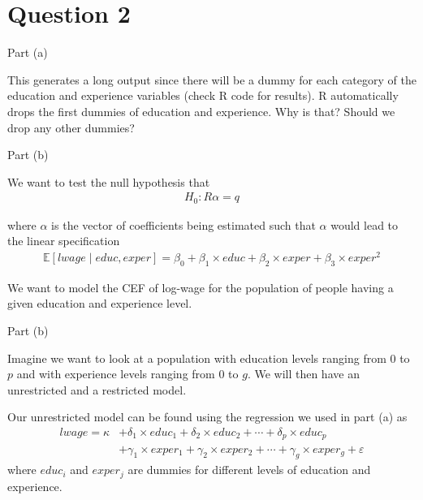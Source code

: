 \section{Question 2}

\begin{frame}{Part (a)}
    
    This generates a long output since there will be a dummy for each category of the education and experience variables (check R code for results). R automatically drops the first dummies of education and experience. Why is that? Should we drop any other dummies?
    
\end{frame}

\begin{frame}{Part (b)}

    We want to test the null hypothesis that
    \begin{align*}
        H_0: R \alpha = q
    \end{align*}

    where $\alpha$ is the vector of coefficients being estimated such that $\alpha$ would lead to the linear specification
    \begin{align*}
        \mathbb{E} [lwage \mid educ, exper] = \beta_0 + \beta_1 \times educ + \beta_2 \times exper + \beta_3 \times exper^2 
    \end{align*}

    We want to model the CEF of log-wage for the population of people having a given education and experience level.
    
\end{frame}

\begin{frame}{Part (b)}

    Imagine we want to look at a population with education levels ranging from $0$ to $p$ and with experience levels ranging from $0$ to $g$. We will then have an unrestricted and a restricted model.

    Our unrestricted model can be found using the regression we used in part (a) as
    \begin{align*}
        lwage = \kappa &+ \delta_1 \times educ_1 + \delta_2 \times educ_2 + \cdots + \delta_p \times educ_p
        \\
        &+ \gamma_1 \times exper_1 +  \gamma_2 \times exper_2 + \cdots + \gamma_g \times exper_g + \varepsilon 
    \end{align*}
    where $educ_i$ and $exper_j$ are dummies for different levels of education and experience.
    
\end{frame}

